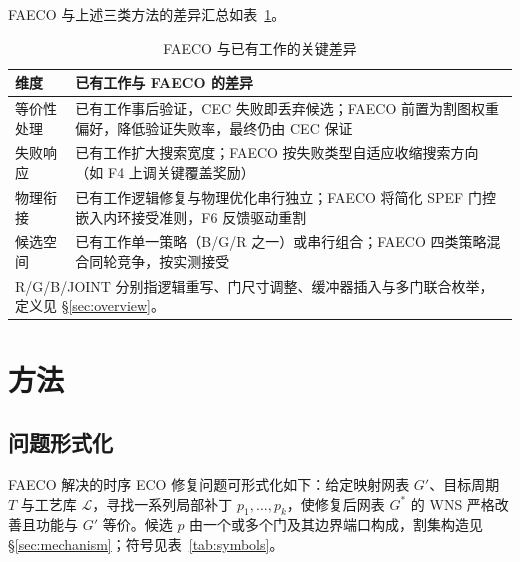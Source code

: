 \documentclass[twocolumn,10pt]{ctexart}
\begin{document}
FAECO 与上述三类方法的差异汇总如表~\ref{tab:related_diff}。

\begin{table}[ht]
\centering
\caption{FAECO 与已有工作的关键差异}
\label{tab:related_diff}
\footnotesize
\setlength{\tabcolsep}{2pt}
\begin{tabular}{p{1.3cm}p{6.0cm}}
\toprule
\textbf{维度} & \textbf{已有工作与 FAECO 的差异} \\
\midrule
等价性处理 & 已有工作事后验证，CEC 失败即丢弃候选；FAECO 前置为割图权重偏好，降低验证失败率，最终仍由 CEC 保证 \\
失败响应 & 已有工作扩大搜索宽度；FAECO 按失败类型自适应收缩搜索方向（如 F4 上调关键覆盖奖励） \\
物理衔接 & 已有工作逻辑修复与物理优化串行独立；FAECO 将简化 SPEF 门控嵌入内环接受准则，F6 反馈驱动重割 \\
候选空间 & 已有工作单一策略（B/G/R 之一）或串行组合；FAECO 四类策略混合同轮竞争，按实测接受 \\
\bottomrule
\multicolumn{2}{p{7.0cm}}{\footnotesize R/G/B/JOINT 分别指逻辑重写、门尺寸调整、缓冲器插入与多门联合枚举，定义见 \S\ref{sec:overview}。}\\
\end{tabular}
\end{table}

\section{方法}

\subsection{问题形式化}
FAECO 解决的时序 ECO 修复问题可形式化如下：给定映射网表 $G'$、目标周期 $T$ 与工艺库 $\mathcal{L}$，寻找一系列局部补丁 $p_1,\dots,p_k$，使修复后网表 $G^*$ 的 WNS 严格改善且功能与 $G'$ 等价。候选 $p$ 由一个或多个门及其边界端口构成，割集构造见 \S\ref{sec:mechanism}；符号见表~\ref{tab:symbols}。
\end{document}

